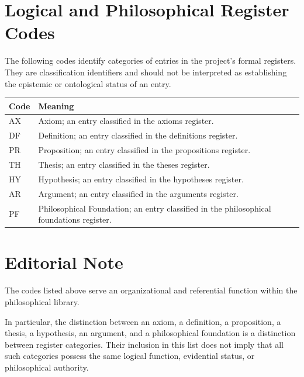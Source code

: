 
\section*{Logical and Philosophical Register Codes}

The following codes identify categories of entries in the project's
formal registers. They are classification identifiers and should not
be interpreted as establishing the epistemic or ontological status
of an entry.

\begin{center}
\begin{tabular}{|p{}|p{}|}
\hline
\textbf{Code} & \textbf{Meaning} \\
\hline
AX
&
Axiom; an entry classified in the axioms register.
\\
\hline
DF
&
Definition; an entry classified in the definitions register.
\\
\hline
PR
&
Proposition; an entry classified in the propositions register.
\\
\hline
TH
&
Thesis; an entry classified in the theses register.
\\
\hline
HY
&
Hypothesis; an entry classified in the hypotheses register.
\\
\hline
AR
&
Argument; an entry classified in the arguments register.
\\
\hline
PF
&
Philosophical Foundation; an entry classified in the
philosophical foundations register.
\\
\hline
\end{tabular}
\end{center}



\section*{Editorial Note}

The codes listed above serve an organizational and referential function
within the philosophical library.

In particular, the distinction between an axiom, a definition, a
proposition, a thesis, a hypothesis, an argument, and a philosophical
foundation is a distinction between register categories. Their inclusion
in this list does not imply that all such categories possess the same
logical function, evidential status, or philosophical authority.

